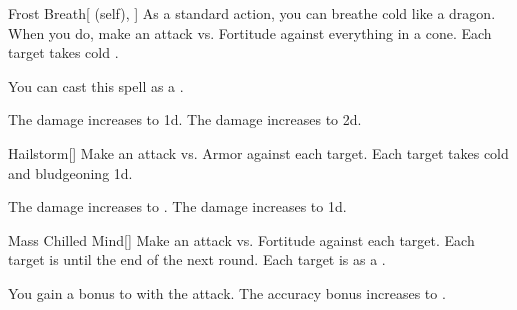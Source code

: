 \lowercase{\hypertarget{spell:Frost Breath}{}}\label{spell:Frost Breath}
\begin{attuneability}[Rank 4]{\hypertarget{spell:Frost Breath}{Frost Breath}}[ (self), ]
As a standard action, you can breathe cold like a dragon.
When you do, make an attack vs. Fortitude against everything in a \arealarge cone.
\hit Each target takes cold .

You can cast this spell as a .

\rankline
{} The damage increases to  \plus1d.
 The damage increases to  \plus2d.

\end{attuneability}
\vspace{0.25em}



\lowercase{\hypertarget{spell:Hailstorm}{}}\label{spell:Hailstorm}
\begin{freeability}[Rank 4]{\hypertarget{spell:Hailstorm}{Hailstorm}}[]
Make an attack vs. Armor against each target.
\hit Each target takes cold and bludgeoning  \minus1d.

\rankline
{} The damage increases to .
 The damage increases to  \plus1d.

\end{freeability}
\vspace{0.25em}



\lowercase{\hypertarget{spell:Mass Chilled Mind}{}}\label{spell:Mass Chilled Mind}
\begin{freeability}[Rank 4]{\hypertarget{spell:Mass Chilled Mind}{Mass Chilled Mind}}[]
Make an attack vs. Fortitude against each target.
\hit Each target is  until the end of the next round.
\crit Each target is  as a .

\rankline
{} You gain a  bonus to  with the attack.
 The accuracy bonus increases to .

\end{freeability}
\vspace{0.25em}



